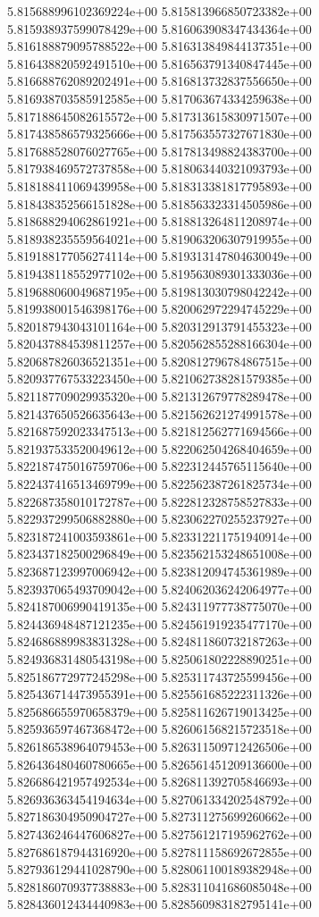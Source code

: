 5.815688996102369224e+00
5.815813966850723382e+00
5.815938937599078429e+00
5.816063908347434364e+00
5.816188879095788522e+00
5.816313849844137351e+00
5.816438820592491510e+00
5.816563791340847445e+00
5.816688762089202491e+00
5.816813732837556650e+00
5.816938703585912585e+00
5.817063674334259638e+00
5.817188645082615572e+00
5.817313615830971507e+00
5.817438586579325666e+00
5.817563557327671830e+00
5.817688528076027765e+00
5.817813498824383700e+00
5.817938469572737858e+00
5.818063440321093793e+00
5.818188411069439958e+00
5.818313381817795893e+00
5.818438352566151828e+00
5.818563323314505986e+00
5.818688294062861921e+00
5.818813264811208974e+00
5.818938235559564021e+00
5.819063206307919955e+00
5.819188177056274114e+00
5.819313147804630049e+00
5.819438118552977102e+00
5.819563089301333036e+00
5.819688060049687195e+00
5.819813030798042242e+00
5.819938001546398176e+00
5.820062972294745229e+00
5.820187943043101164e+00
5.820312913791455323e+00
5.820437884539811257e+00
5.820562855288166304e+00
5.820687826036521351e+00
5.820812796784867515e+00
5.820937767533223450e+00
5.821062738281579385e+00
5.821187709029935320e+00
5.821312679778289478e+00
5.821437650526635643e+00
5.821562621274991578e+00
5.821687592023347513e+00
5.821812562771694566e+00
5.821937533520049612e+00
5.822062504268404659e+00
5.822187475016759706e+00
5.822312445765115640e+00
5.822437416513469799e+00
5.822562387261825734e+00
5.822687358010172787e+00
5.822812328758527833e+00
5.822937299506882880e+00
5.823062270255237927e+00
5.823187241003593861e+00
5.823312211751940914e+00
5.823437182500296849e+00
5.823562153248651008e+00
5.823687123997006942e+00
5.823812094745361989e+00
5.823937065493709042e+00
5.824062036242064977e+00
5.824187006990419135e+00
5.824311977738775070e+00
5.824436948487121235e+00
5.824561919235477170e+00
5.824686889983831328e+00
5.824811860732187263e+00
5.824936831480543198e+00
5.825061802228890251e+00
5.825186772977245298e+00
5.825311743725599456e+00
5.825436714473955391e+00
5.825561685222311326e+00
5.825686655970658379e+00
5.825811626719013425e+00
5.825936597467368472e+00
5.826061568215723518e+00
5.826186538964079453e+00
5.826311509712426506e+00
5.826436480460780665e+00
5.826561451209136600e+00
5.826686421957492534e+00
5.826811392705846693e+00
5.826936363454194634e+00
5.827061334202548792e+00
5.827186304950904727e+00
5.827311275699260662e+00
5.827436246447606827e+00
5.827561217195962762e+00
5.827686187944316920e+00
5.827811158692672855e+00
5.827936129441028790e+00
5.828061100189382948e+00
5.828186070937738883e+00
5.828311041686085048e+00
5.828436012434440983e+00
5.828560983182795141e+00
